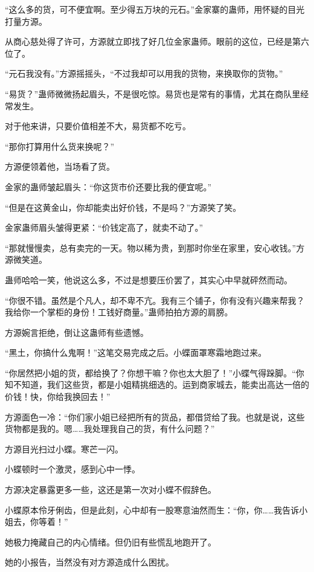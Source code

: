 
\begin{this_body}

“这么多的货，可不便宜啊。至少得五万块的元石。”金家寨的蛊师，用怀疑的目光打量方源。

从商心慈处得了许可，方源就立即找了好几位金家蛊师。眼前的这位，已经是第六位了。

“元石我没有。”方源摇摇头，“不过我却可以用我的货物，来换取你的货物。”

“易货？”蛊师微微扬起眉头，不是很吃惊。易货也是常有的事情，尤其在商队里经常发生。

对于他来讲，只要价值相差不大，易货都不吃亏。

“那你打算用什么货来换呢？”

方源便领着他，当场看了货。

金家的蛊师皱起眉头：“你这货市价还要比我的便宜呢。”

“但是在这黄金山，你却能卖出好价钱，不是吗？”方源笑了笑。

金家蛊师眉头皱得更紧：“价钱定高了，就卖不动了。”

“那就慢慢卖，总有卖完的一天。物以稀为贵，到那时你坐在家里，安心收钱。”方源微笑道。

蛊师哈哈一笑，他说这么多，不过是想要压价罢了，其实心中早就砰然而动。

“你很不错。虽然是个凡人，却不卑不亢。我有三个铺子，你有没有兴趣来帮我？我给你一个掌柜的身份！工钱好商量。”蛊师拍拍方源的肩膀。

方源婉言拒绝，倒让这蛊师有些遗憾。

“黑土，你搞什么鬼啊！”这笔交易完成之后。小蝶面罩寒霜地跑过来。

“你居然把小姐的货，都给换了？你想干嘛？你也太大胆了！”小蝶气得跺脚。“你知不知道，我们这些货，都是小姐精挑细选的。运到商家城去，能卖出高达一倍的价钱！快，你给我换回去！”

方源面色一冷：“你们家小姐已经把所有的货品，都借贷给了我。也就是说，这些货物都是我的。嗯……我处理我自己的货，有什么问题？”

方源目光扫过小蝶。寒芒一闪。

小蝶顿时一个激灵，感到心中一悸。

方源决定暴露更多一些，这还是第一次对小蝶不假辞色。

小蝶原本伶牙俐齿，但是此刻，心中却有一股寒意油然而生：“你，你……我告诉小姐去，你等着！”

她极力掩藏自己的内心情绪。但仍旧有些慌乱地跑开了。

她的小报告，当然没有对方源造成什么困扰。


\end{this_body}
